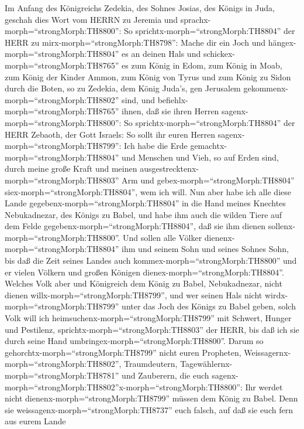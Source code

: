  Im Anfang des Königreichs Zedekia, des Sohnes Josias, des
Königs in Juda, geschah dies Wort vom HERRN zu Jeremia und
sprachx-morph=``strongMorph:TH8800'':  So
sprichtx-morph=``strongMorph:TH8804'' der HERR zu
mirx-morph=``strongMorph:TH8798'': Mache dir ein Joch und
hängex-morph=``strongMorph:TH8804'' es an deinen Hals  und
schickex-morph=``strongMorph:TH8765'' es zum König in Edom, zum König in
Moab, zum König der Kinder Ammon, zum König von Tyrus und zum König zu
Sidon durch die Boten, so zu Zedekia, dem König Juda's, gen Jerusalem
gekommenx-morph=``strongMorph:TH8802'' sind,  und
befiehlx-morph=``strongMorph:TH8765'' ihnen, daß sie ihren Herren
sagenx-morph=``strongMorph:TH8800'': So
sprichtx-morph=``strongMorph:TH8804'' der HERR Zebaoth, der Gott
Israels: So sollt ihr euren Herren sagenx-morph=``strongMorph:TH8799'':
 Ich habe die Erde gemachtx-morph=``strongMorph:TH8804'' und
Menschen und Vieh, so auf Erden sind, durch meine große Kraft und meinen
ausgestrecktenx-morph=``strongMorph:TH8803'' Arm und
gebex-morph=``strongMorph:TH8804'' siex-morph=``strongMorph:TH8804'',
wem ich will.  Nun aber habe ich alle diese Lande
gegebenx-morph=``strongMorph:TH8804'' in die Hand meines Knechtes
Nebukadnezar, des Königs zu Babel, und habe ihm auch die wilden Tiere
auf dem Felde gegebenx-morph=``strongMorph:TH8804'', daß sie ihm dienen
sollenx-morph=``strongMorph:TH8800''.  Und sollen alle
Völker dienenx-morph=``strongMorph:TH8804'' ihm und seinem Sohn und
seines Sohnes Sohn, bis daß die Zeit seines Landes auch
kommex-morph=``strongMorph:TH8800'' und er vielen Völkern und großen
Königen dienex-morph=``strongMorph:TH8804''.  Welches Volk
aber und Königreich dem König zu Babel, Nebukadnezar, nicht dienen
willx-morph=``strongMorph:TH8799'', und wer seinen Hals nicht
wirdx-morph=``strongMorph:TH8799'' unter das Joch des Königs zu Babel
geben, solch Volk will ich heimsuchenx-morph=``strongMorph:TH8799'' mit
Schwert, Hunger und Pestilenz, sprichtx-morph=``strongMorph:TH8803'' der
HERR, bis daß ich sie durch seine Hand
umbringex-morph=``strongMorph:TH8800''.  Darum so
gehorchtx-morph=``strongMorph:TH8799'' nicht euren Propheten,
Weissagernx-morph=``strongMorph:TH8802'', Traumdeutern,
Tagewählernx-morph=``strongMorph:TH8781'' und Zauberern, die euch
sagenx-morph=``strongMorph:TH8802''x-morph=``strongMorph:TH8800'': Ihr
werdet nicht dienenx-morph=``strongMorph:TH8799'' müssen dem König zu
Babel.  Denn sie weissagenx-morph=``strongMorph:TH8737''
euch falsch, auf daß sie euch fern aus eurem Lande
